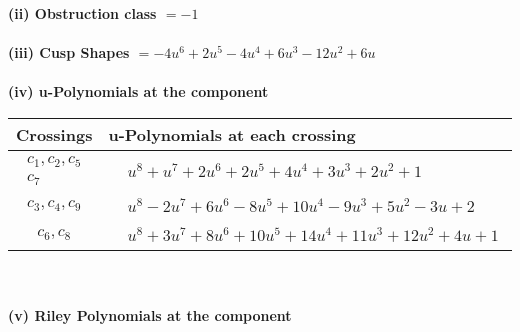 \documentclass[1p]{elsarticle_modified}
\theoremstyle{definition}
\begin{document}
\flushleft \textbf{(ii) Obstruction class $= -1$}\\~\\
\flushleft \textbf{(iii) Cusp Shapes $= -4 u^6+2 u^5-4 u^4+6 u^3-12 u^2+6 u$}\\~\\
\newpage\renewcommand{\arraystretch}{1}
\flushleft \textbf{(iv) u-Polynomials at the component}\newline \\
\begin{tabular}{m{50pt}|m{274pt}}
Crossings & \hspace{64pt}u-Polynomials at each crossing \\
\hline $$\begin{aligned}c_{1},c_{2},c_{5}\\c_{7}\end{aligned}$$&$\begin{aligned}
&u^8+u^7+2 u^6+2 u^5+4 u^4+3 u^3+2 u^2+1
\end{aligned}$\\
\hline $$\begin{aligned}c_{3},c_{4},c_{9}\end{aligned}$$&$\begin{aligned}
&u^8-2 u^7+6 u^6-8 u^5+10 u^4-9 u^3+5 u^2-3 u+2
\end{aligned}$\\
\hline $$\begin{aligned}c_{6},c_{8}\end{aligned}$$&$\begin{aligned}
&u^8+3 u^7+8 u^6+10 u^5+14 u^4+11 u^3+12 u^2+4 u+1
\end{aligned}$\\
\hline
\end{tabular}\\~\\
\newpage\renewcommand{\arraystretch}{1}
\flushleft \textbf{(v) Riley Polynomials at the component}\newline \\
\end{document}
